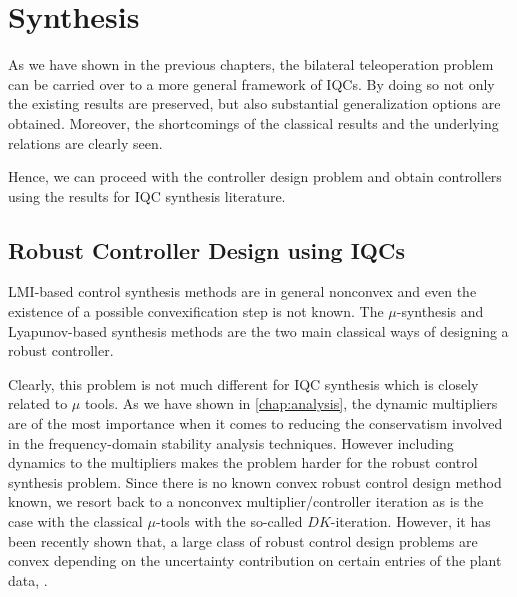 \chapter{Synthesis}
\label{chap:synth}

As we have shown in the previous chapters, the bilateral teleoperation problem can be carried over to a more general
framework of IQCs. By doing so not only the existing results are preserved, but also substantial generalization
options are obtained. Moreover, the shortcomings of the classical results and the underlying relations are clearly 
seen. 

Hence, we can proceed with the controller design problem and obtain controllers using the results for IQC synthesis
literature.

\section{Robust Controller Design using IQCs}
LMI-based control synthesis methods are in general nonconvex and even the existence of a possible convexification step 
is not known. The $\mu$-synthesis and Lyapunov-based synthesis methods are the two main classical ways of designing
a robust controller. 

Clearly, this problem is not much different for IQC synthesis which is closely related to $\mu$
tools. As we have shown in \cref{chap:analysis}, the dynamic multipliers are of the most importance when it comes to 
reducing the conservatism involved in the frequency-domain stability analysis techniques. However including dynamics 
to the multipliers makes the problem harder for the robust control synthesis problem. Since there is no known convex 
robust control design method known, we resort back to a nonconvex multiplier/controller iteration as is the case with 
the classical $\mu$-tools with the so-called $DK$-iteration. However, it has been recently shown that, a large class
of robust control design problems are convex depending on the uncertainty contribution on certain entries of the plant 
data, \cite{scherer2009}. 
